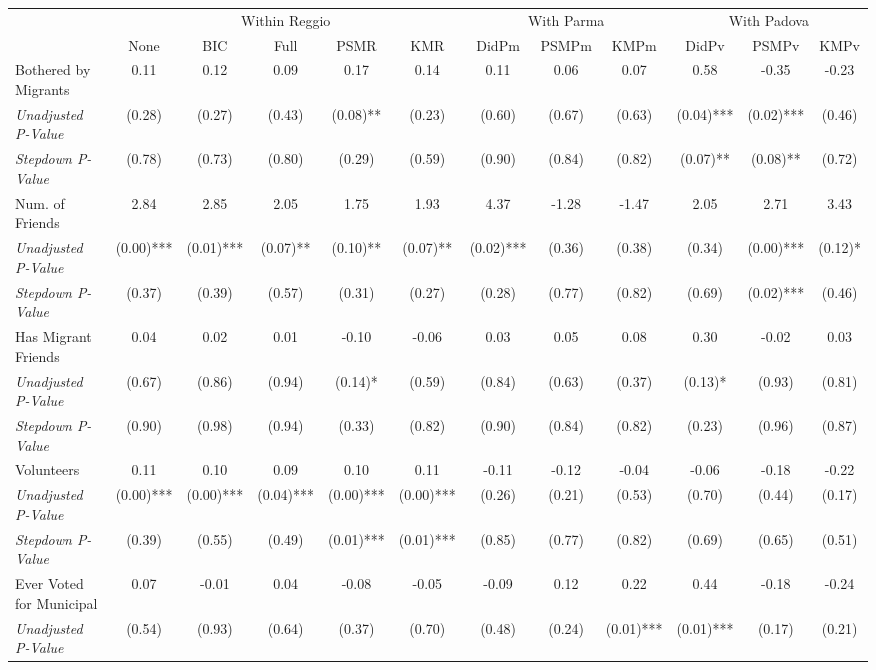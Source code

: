 \begin{tabular}{l c c c c c c c c c c c}
\toprule
& \multicolumn{5}{c}{Within Reggio} & \multicolumn{3}{c}{With Parma} & \multicolumn{3}{c}{With Padova} \\\cmidrule(lr){2-6} \cmidrule(lr){7-9} \cmidrule(lr){10-12}
 & None & BIC & Full & PSMR & KMR & DidPm & PSMPm & KMPm & DidPv & PSMPv & KMPv \\
\midrule
Bothered by Migrants & 0.11 & 0.12 & 0.09 & 0.17 & 0.14 & 0.11 & 0.06 & 0.07 & 0.58 & -0.35 & -0.23 \\
\quad \textit{Unadjusted P-Value} & (0.28) & (0.27) & (0.43) & (0.08)** & (0.23) & (0.60) & (0.67) & (0.63) & (0.04)*** & (0.02)*** & (0.46) \\
\quad \textit{Stepdown P-Value} & (0.78) & (0.73) & (0.80) & (0.29) & (0.59) & (0.90) & (0.84) & (0.82) & (0.07)** & (0.08)** & (0.72) \\
Num. of Friends & 2.84 & 2.85 & 2.05 & 1.75 & 1.93 & 4.37 & -1.28 & -1.47 & 2.05 & 2.71 & 3.43 \\
\quad \textit{Unadjusted P-Value} & (0.00)*** & (0.01)*** & (0.07)** & (0.10)** & (0.07)** & (0.02)*** & (0.36) & (0.38) & (0.34) & (0.00)*** & (0.12)* \\
\quad \textit{Stepdown P-Value} & (0.37) & (0.39) & (0.57) & (0.31) & (0.27) & (0.28) & (0.77) & (0.82) & (0.69) & (0.02)*** & (0.46) \\
Has Migrant Friends & 0.04 & 0.02 & 0.01 & -0.10 & -0.06 & 0.03 & 0.05 & 0.08 & 0.30 & -0.02 & 0.03 \\
\quad \textit{Unadjusted P-Value} & (0.67) & (0.86) & (0.94) & (0.14)* & (0.59) & (0.84) & (0.63) & (0.37) & (0.13)* & (0.93) & (0.81) \\
\quad \textit{Stepdown P-Value} & (0.90) & (0.98) & (0.94) & (0.33) & (0.82) & (0.90) & (0.84) & (0.82) & (0.23) & (0.96) & (0.87) \\
Volunteers & 0.11 & 0.10 & 0.09 & 0.10 & 0.11 & -0.11 & -0.12 & -0.04 & -0.06 & -0.18 & -0.22 \\
\quad \textit{Unadjusted P-Value} & (0.00)*** & (0.00)*** & (0.04)*** & (0.00)*** & (0.00)*** & (0.26) & (0.21) & (0.53) & (0.70) & (0.44) & (0.17) \\
\quad \textit{Stepdown P-Value} & (0.39) & (0.55) & (0.49) & (0.01)*** & (0.01)*** & (0.85) & (0.77) & (0.82) & (0.69) & (0.65) & (0.51) \\
Ever Voted for Municipal & 0.07 & -0.01 & 0.04 & -0.08 & -0.05 & -0.09 & 0.12 & 0.22 & 0.44 & -0.18 & -0.24 \\
\quad \textit{Unadjusted P-Value} & (0.54) & (0.93) & (0.64) & (0.37) & (0.70) & (0.48) & (0.24) & (0.01)*** & (0.01)*** & (0.17) & (0.21) \\

\end{tabular}

